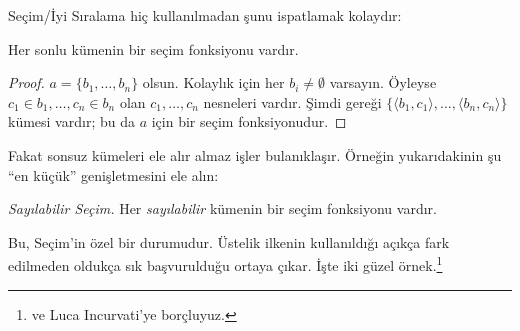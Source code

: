 


Seçim/İyi Sıralama hiç kullanılmadan şunu ispatlamak kolaydır:

\begin{lem}
Her sonlu kümenin bir seçim fonksiyonu vardır.
\end{lem}

\begin{proof}
$a=\{b_1,\ldots,b_n\}$ olsun. Kolaylık için her
$b_i\neq\emptyset$ varsayın. Öyleyse
$c_1\in b_1,\ldots,c_n\in b_n$ olan $c_1,\ldots,c_n$ nesneleri vardır.
Şimdi  gereği
$\{\langle b_1,c_1\rangle,\ldots,\langle b_n,c_n\rangle\}$ kümesi
vardır; bu da $a$ için bir seçim fonksiyonudur.
\end{proof}

Fakat sonsuz kümeleri ele alır almaz işler bulanıklaşır. Örneğin
yukarıdakinin şu ``en küçük'' genişletmesini ele alın:

\begin{defish}
\emph{Sayılabilir Seçim.} Her \emph{sayılabilir} kümenin bir seçim
fonksiyonu vardır.
\end{defish}

Bu, Seçim'in özel bir durumudur. Üstelik ilkenin kullanıldığı açıkça fark
edilmeden oldukça sık başvurulduğu ortaya çıkar. İşte iki güzel
örnek.\footnote{\citet[\S9.4]{Potter2004} ve Luca Incurvati'ye borçluyuz.}

